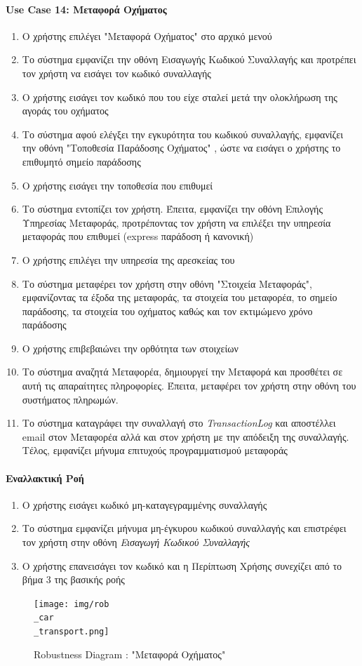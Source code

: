 \documentclass{../ol-softwaremanual}
\begin{document}
	\paragraph{\en Use Case 14: \gr Μεταφορά Οχήματος}  
	\begin{enumerate}
		\item Ο χρήστης επιλέγει \en"\gr Μεταφορά Οχήματος\en" \gr στο αρχικό μενού
		\item Το σύστημα εμφανίζει την οθόνη Εισαγωγής Κωδικού Συναλλαγής και προτρέπει τον χρήστη να εισάγει τον κωδικό συναλλαγής
		\item Ο χρήστης εισάγει τον κωδικό που του είχε σταλεί μετά την ολοκλήρωση της αγοράς του οχήματος
		\item Το σύστημα αφού ελέγξει την εγκυρότητα του κωδικού συναλλαγής, εμφανίζει την οθόνη \en"\gr Τοποθεσία Παράδοσης Οχήματος\en" \gr, ώστε να εισάγει ο χρήστης το επιθυμητό σημείο παράδοσης
		\item Ο χρήστης εισάγει την τοποθεσία που επιθυμεί
		\item Το σύστημα εντοπίζει τον χρήστη. Έπειτα, εμφανίζει την οθόνη Επιλογής Υπηρεσίας Μεταφοράς, προτρέποντας τον χρήστη να επιλέξει την υπηρεσία μεταφοράς που επιθυμεί (\en express \gr παράδοση ή κανονική)		
		\item Ο χρήστης επιλέγει την υπηρεσία της αρεσκείας του
		\item Το σύστημα μεταφέρει τον χρήστη στην οθόνη \en"\gr Στοιχεία Μεταφοράς\en"\gr, εμφανίζοντας τα έξοδα της μεταφοράς, τα στοιχεία του μεταφορέα, το σημείο παράδοσης, τα στοιχεία του οχήματος καθώς και τον εκτιμώμενο χρόνο παράδοσης 
		\item Ο χρήστης επιβεβαιώνει την ορθότητα των στοιχείων 
		\item Το σύστημα αναζητά Μεταφορέα, δημιουργεί την Μεταφορά και προσθέτει σε αυτή τις απαραίτητες πληροφορίες. Έπειτα, μεταφέρει τον χρήστη στην οθόνη του συστήματος πληρωμών.
		\item Το σύστημα καταγράφει την συναλλαγή στο \en \textit{TransactionLog} \gr	και αποστέλλει \en email \gr στον Μεταφορέα αλλά και στον χρήστη με την απόδειξη της συναλλαγής. Τέλος, εμφανίζει μήνυμα επιτυχούς προγραμματισμού μεταφοράς
	\end{enumerate}
	
	\paragraph{Εναλλακτική Ροή}
	\begin{enumerate}
		\item Ο χρήστης εισάγει κωδικό μη-καταγεγραμμένης συναλλαγής
		\item Το σύστημα εμφανίζει μήνυμα μη-έγκυρου κωδικού συναλλαγής και επιστρέφει τον χρήστη στην οθόνη \textit{Εισαγωγή Κωδικού Συναλλαγής} 
		\item Ο χρήστης επανεισάγει τον κωδικό και η Περίπτωση Χρήσης συνεχίζει από το βήμα 3 της βασικής ροής
	\end{enumerate}
	
	\begin{figure}[htbp!]
		\texttt{[image: img/rob\\\_car\\\_transport.png]}
		\caption{\en Robustness Diagram : "\gr Μεταφορά Οχήματος\en"\gr}
	\end{figure}
	
	
	
	
	
	
	
	
	
	
\end{document}
